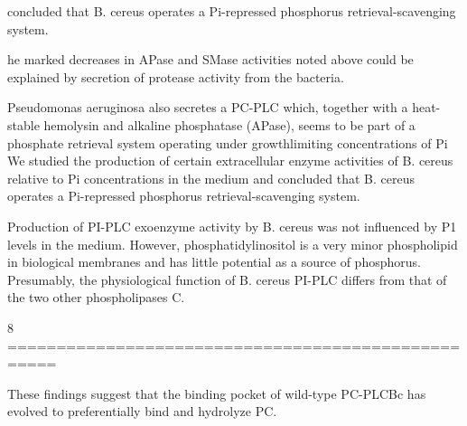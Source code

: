  concluded that B. cereus operates a Pi-repressed phosphorus retrieval-scavenging system.
 
 he marked decreases in APase and SMase activities noted above could be explained by secretion of protease activity from the bacteria. 

  Pseudomonas aeruginosa also secretes a PC-PLC which, together with a heat-stable hemolysin and alkaline phosphatase (APase), seems to be part of a phosphate retrieval system operating under growthlimiting concentrations of Pi
  We studied the production of certain extracellular enzyme activities of B. cereus relative to Pi concentrations in the medium and concluded that B. cereus operates a Pi-repressed phosphorus retrieval-scavenging system.

  Production of PI-PLC exoenzyme activity by B. cereus was not influenced by P1 levels in the medium. However, phosphatidylinositol is a very minor phospholipid in biological membranes and has little potential as a source of phosphorus. Presumably, the physiological function of B. cereus PI-PLC differs from that of the two other phospholipases C.




8
===================================================

These ﬁndings suggest that the binding pocket of wild-type PC-PLCBc has evolved to preferentially bind and hydrolyze PC. 
